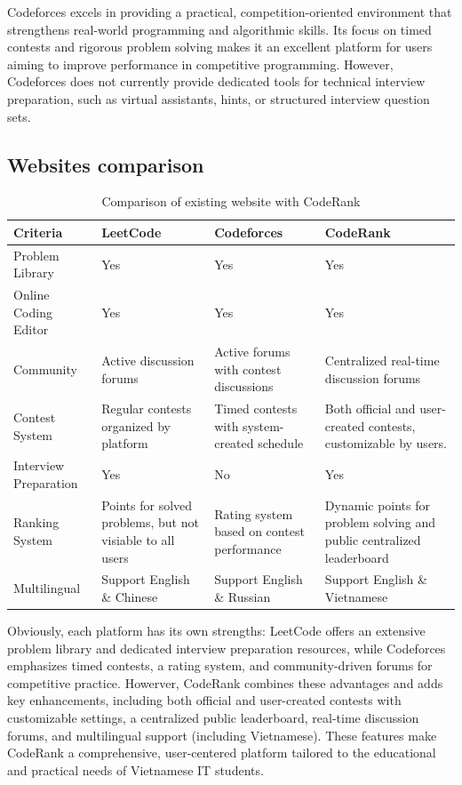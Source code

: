 Codeforces excels in providing a practical, competition-oriented environment that strengthens real-world programming and algorithmic skills. Its focus on timed contests and rigorous problem solving makes it an excellent platform for users aiming to improve performance in competitive programming. However, Codeforces does not currently provide dedicated tools for technical interview preparation, such as virtual assistants, hints, or structured interview question sets.

\subsection{ Websites comparison}
\begin{table}[h!]
\centering
\renewcommand{\arraystretch}{1.3}
\caption{Comparison of existing website with CodeRank}
\label{tab:website-comparison}
\begin{tabularx}{\textwidth}{|l|X|X|X|}
\hline
\textbf{Criteria} & \textbf{LeetCode} & \textbf{Codeforces} & \textbf{CodeRank} \\
\hline
Problem Library & Yes & Yes & Yes \\
\hline
Online Coding Editor & Yes & Yes & Yes \\
\hline
Community & Active discussion forums & Active forums with contest discussions & Centralized real-time discussion forums \\
\hline
Contest System & Regular contests organized by platform & Timed contests with system-created schedule & Both official and user-created contests, customizable by users. \\
\hline
Interview Preparation & Yes & No & Yes \\
\hline
Ranking System & Points for solved problems, but not visiable to all users & Rating system based on contest performance & Dynamic points for problem solving and public centralized leaderboard \\
\hline
Multilingual & Support English \& Chinese & Support English \& Russian & Support English \& Vietnamese \\
\hline
\end{tabularx}
\end{table}

\FloatBarrier

Obviously, each platform has its own strengths: LeetCode offers an extensive problem library and dedicated interview preparation resources, while Codeforces emphasizes timed contests, a rating system, and community-driven forums for competitive practice. Howerver, CodeRank combines these advantages and adds key enhancements, including both official and user-created contests with customizable settings, a centralized public leaderboard, real-time discussion forums, and multilingual support (including Vietnamese). These features make CodeRank a comprehensive, user-centered platform tailored to the educational and practical needs of Vietnamese IT students.
